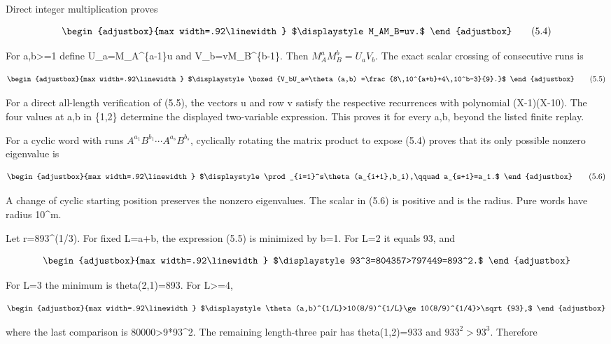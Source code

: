 Direct integer multiplication proves

\[
\begin{adjustbox}{max width=.92\linewidth}
$\displaystyle M_AM_B=uv.$
\end{adjustbox}
\tag{5.4}
\]

For a,b\textgreater=1 define U\_a=M\_A\^{}\{a-1\}u and V\_b=vM\_B\^{}\{b-1\}. Then \(M_A^aM_B^b=U_aV_b\). The exact scalar crossing of consecutive runs is

\[
\begin{adjustbox}{max width=.92\linewidth}
$\displaystyle \boxed{V_bU_a=\theta(a,b)
 =\frac{8\,10^{a+b}+4\,10^b-3}{9}.}$
\end{adjustbox}
\tag{5.5}
\]

For a direct all-length verification of (5.5), the vectors u and row v satisfy the respective recurrences with polynomial (X-1)(X-10). The four values at a,b in \{1,2\} determine the displayed two-variable expression. This proves it for every a,b, beyond the listed finite replay.

For a cyclic word with runs \(A^{a_1}B^{b_1}\cdots A^{a_s}B^{b_s}\), cyclically rotating the matrix product to expose (5.4) proves that its only possible nonzero eigenvalue is

\[
\begin{adjustbox}{max width=.92\linewidth}
$\displaystyle \prod_{i=1}^s\theta(a_{i+1},b_i),\qquad a_{s+1}=a_1.$
\end{adjustbox}
\tag{5.6}
\]

A change of cyclic starting position preserves the nonzero eigenvalues. The scalar in (5.6) is positive and is the radius. Pure words have radius 10\^{}m.

Let r=893\^{}(1/3). For fixed L=a+b, the expression (5.5) is minimized by b=1. For L=2 it equals 93, and

\[
\begin{adjustbox}{max width=.92\linewidth}
$\displaystyle 93^3=804357>797449=893^2.$
\end{adjustbox}
\]

For L=3 the minimum is theta(2,1)=893. For L\textgreater=4,

\[
\begin{adjustbox}{max width=.92\linewidth}
$\displaystyle \theta(a,b)^{1/L}>10(8/9)^{1/L}\ge10(8/9)^{1/4}>\sqrt{93},$
\end{adjustbox}
\]

where the last comparison is 80000\textgreater9*93\^{}2. The remaining length-three pair has theta(1,2)=933 and \(933^2>93^3\). Therefore

